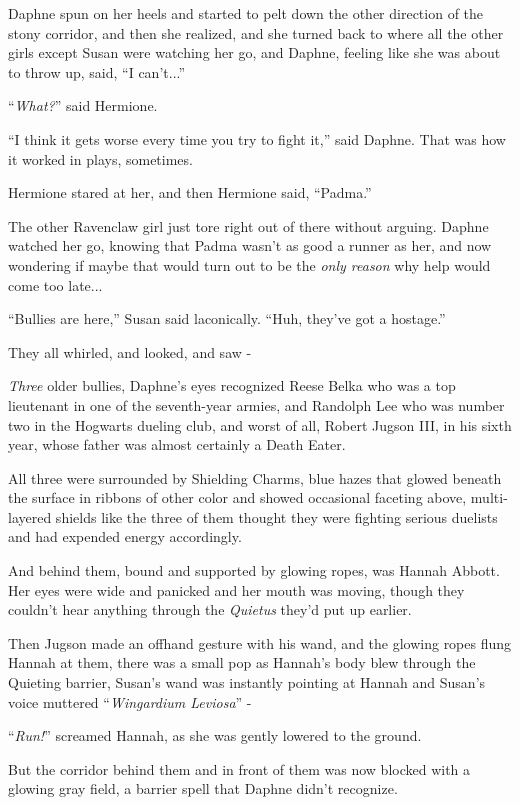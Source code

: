 Daphne spun on her heels and started to pelt down the other direction of the stony corridor, and then she realized, and she turned back to where all the other girls except Susan were watching her go, and Daphne, feeling like she was about to throw up, said, ``I can't...''

``\emph{What?}'' said Hermione.

``I think it gets worse every time you try to fight it,'' said Daphne. That was how it worked in plays, sometimes.

Hermione stared at her, and then Hermione said, ``Padma.''

The other Ravenclaw girl just tore right out of there without arguing. Daphne watched her go, knowing that Padma wasn't as good a runner as her, and now wondering if maybe that would turn out to be the \emph{only reason} why help would come too late...

``Bullies are here,'' Susan said laconically. ``Huh, they've got a hostage.''

They all whirled, and looked, and saw -

\emph{Three} older bullies, Daphne's eyes recognized Reese Belka who was a top lieutenant in one of the seventh-year armies, and Randolph Lee who was number two in the Hogwarts dueling club, and worst of all, Robert Jugson III, in his sixth year, whose father was almost certainly a Death Eater.

All three were surrounded by Shielding Charms, blue hazes that glowed beneath the surface in ribbons of other color and showed occasional faceting above, multi-layered shields like the three of them thought they were fighting serious duelists and had expended energy accordingly.

And behind them, bound and supported by glowing ropes, was Hannah Abbott. Her eyes were wide and panicked and her mouth was moving, though they couldn't hear anything through the \emph{Quietus} they'd put up earlier.

Then Jugson made an offhand gesture with his wand, and the glowing ropes flung Hannah at them, there was a small pop as Hannah's body blew through the Quieting barrier, Susan's wand was instantly pointing at Hannah and Susan's voice muttered ``\emph{Wingardium Leviosa}'' -

``\emph{Run!}'' screamed Hannah, as she was gently lowered to the ground.

But the corridor behind them and in front of them was now blocked with a glowing gray field, a barrier spell that Daphne didn't recognize.

